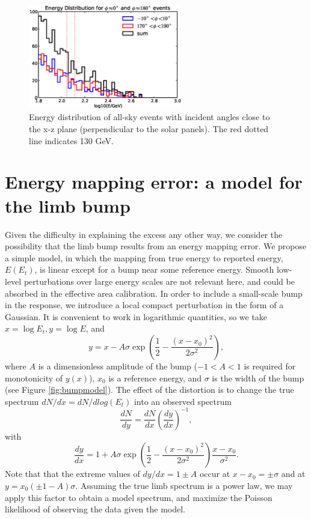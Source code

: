 \documentclass[aps,twocolumn,prd,superscriptaddress,showpacs,nofootinbib,fixfloat]{revtex4}
\newcommand{\be}{\begin{equation}}
\newcommand{\ee}{\end{equation}}
\begin{document}
\begin{figure}
\centering
\includegraphics[width=0.6\textwidth]{plots/phi_energy.eps}
\caption{Energy distribution of all-sky events with incident angles close to
the x-z plane (perpendicular to the solar panels). The red dotted line
indicates 130 GeV.}
\label{fig:spectrum_phi}
\end{figure}

\section{Energy mapping error: a model for the limb bump}
Given the difficulty in explaining the excess any other way, we consider the
possibility that the limb bump results from an energy mapping error.  We
propose a simple model, in which the mapping from true energy to reported
energy, $E(E_t)$, is linear except for a bump near some reference energy.
Smooth low-level perturbations over large energy scales are not relevant here,
and could be absorbed in the effective area calibration.  In order to include
a small-scale bump in the response, we introduce a local compact perturbation
in the form of a Gaussian.  It is convenient to work in logarithmic
quantities, so we take $x=\log E_t, y=\log E$, and
\be
\label{eq:yofx}
y=x - A\sigma \exp\left(\frac{1}{2}-\frac{(x-x_0)^2}{2\sigma^2}\right),
\ee
where $A$ is a dimensionless amplitude of the bump ($-1<A<1$ is required
for monotonicity of $y(x)$), $x_0$ is a reference energy, and $\sigma$ is the
width of the bump (see Figure \ref{fig:bumpmodel}).
The effect of the distortion is to change the true spectrum $dN/dx =
dN/dlog(E_t)$ into an observed spectrum
\be
\label{eq:dndy}
\frac{dN}{dy} = \frac{dN}{dx} \left(\frac{dy}{dx}\right)^{-1} ,
\ee
with
\be
\label{eq:dydx}
\frac{dy}{dx} = 1 + A\sigma \exp\left(\frac{1}{2}-\frac{(x-x_0)^2}{2\sigma^2}\right)
\frac{x-x_0}{\sigma^2}.
\ee
Note that that the extreme values of $dy/dx = 1 \pm A$ occur at $x-x_0 = \pm
\sigma$ and at $y=x_0(\pm1-A)\sigma$.  Assuming the true limb spectrum is a
power law, we may apply this factor to obtain a model spectrum, and maximize
the Poisson likelihood of observing the data given the model.
\end{document}
